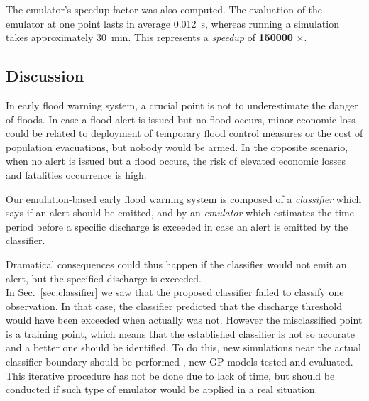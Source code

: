 The emulator's speedup factor was also computed.
The evaluation of the emulator at one point lasts in average \SI{0.012}{\s}, whereas running a simulation takes approximately \SI{30}{\minute}.
This represents a \emph{speedup} of \textbf{\num{150000}} $\bm{\times}$.

\subsection{Discussion}

In early flood warning system, a crucial point is not to underestimate the danger of floods.
In case a flood alert is issued but no flood occurs, minor economic loss could be related to deployment of temporary flood control measures or the cost of population evacuations, but nobody would be armed. 
In the opposite scenario, when no alert is issued but a flood occurs, the risk of elevated economic losses and  fatalities occurrence is high. 
 
Our emulation-based early flood warning system is composed of a \emph{classifier} which says if an alert should be emitted, and by an \emph{emulator} which estimates the time period before a specific discharge is exceeded in case an alert is emitted by the classifier.

Dramatical consequences could thus happen if the classifier would not emit an alert, but the specified discharge is exceeded.\\

In Sec.~\ref{sec:classifier} we saw that the proposed classifier failed to classify one observation.
In that case, the classifier predicted that the discharge threshold would have been exceeded when actually was not. However the misclassified point is a training point, which means that the established classifier is not so accurate and a better one should be identified. 
To do this, new simulations near the actual classifier boundary should be performed , new GP models tested and evaluated. This iterative procedure has not be done due to lack of time, but should be conducted if such type of emulator would be applied in a real situation.  

